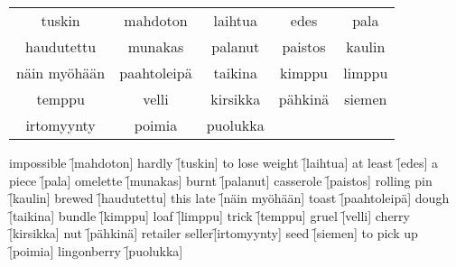 \begin{center}
  \begin{tabular}{|c c c c c|}
    \hline
    tuskin & mahdoton & laihtua & edes & pala \\
    haudutettu & munakas & palanut & paistos & kaulin \\
    näin myöhään & paahtoleipä & taikina & kimppu & limppu \\
    temppu & velli & kirsikka & pähkinä & siemen \\
    irtomyynty & poimia & puolukka && \\
    \hline
  \end{tabular}
\end{center}

\begin{questions}
  \begin{multicols}{3}
    \raggedcolumns
    \question impossible     \f[mahdoton]
    \question hardly         \f[tuskin]
    \question to lose weight \f[laihtua]
    \question at least       \f[edes]
    \question a piece        \f[pala]
    \question omelette       \f[munakas]
    \question burnt          \f[palanut]
    \question casserole      \f[paistos]
    \question rolling pin    \f[kaulin]
    \question brewed         \f[haudutettu]
    \question this late      \f[näin myöhään]
    \question toast          \f[paahtoleipä]
    \question dough          \f[taikina]
    \question bundle         \f[kimppu]
    \question loaf           \f[limppu]
    \question trick          \f[temppu]
    \question gruel          \f[velli]
    \question cherry         \f[kirsikka]
    \question nut            \f[pähkinä]
    \question retailer seller\f[irtomyynty]
    \question seed           \f[siemen]
    \question to pick up     \f[poimia]
    \question lingonberry       \f[puolukka]
  \end{multicols}
\end{questions}

